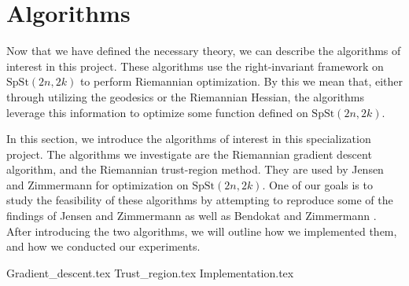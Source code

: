 \section{Algorithms}\label{sec:Algorithms}
Now that we have defined the necessary theory, we can describe the algorithms of interest in this project. These algorithms use the right-invariant framework on $\mathrm{SpSt}(2n, 2k)$ to perform Riemannian optimization. By this we mean that, either through utilizing the geodesics or the Riemannian Hessian, the algorithms leverage this information to optimize some function defined on $\mathrm{SpSt}(2n, 2k)$.

In this section, we introduce the algorithms of interest in this specialization project. The algorithms we investigate are the Riemannian gradient descent algorithm, and the Riemannian trust-region method. They are used by Jensen and Zimmermann for optimization on $\mathrm{SpSt}(2n, 2k)$. One of our goals is to study the feasibility of these algorithms by attempting to reproduce some of the findings of Jensen and Zimmermann \cite{JensenZimmermann2024} as well as Bendokat and Zimmermann \cite{BendokatZimmermann2021}. After introducing the two algorithms, we will outline how we implemented them, and how we conducted our experiments. 

{Gradient_descent.tex}
{Trust_region.tex}
{Implementation.tex}